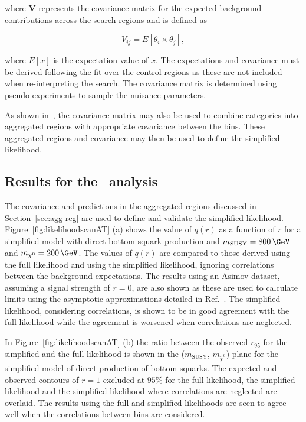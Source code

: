 \noindent where $\mathrm{\mathbf{V}}$ represents the covariance matrix for the expected background 
contributions across the search regions and is defined as

\begin{equation}
V_{ij}=E[\theta_i\times\theta_j],
\label{eq-cov}
\end{equation}

\noindent where $E[x]$ is the expectation value of $x$. The expectations and covariance
must be derived following the fit over the control regions as these are not
included when re-interpreting the search. The covariance matrix is determined
using pseudo-experiments to sample the nuisance parameters. 

As shown in~\cite{simp-lik}, the covariance matrix may also be used to
combine categories into aggregated regions with appropriate covariance between
the bins. These aggregated regions and covariance may then be used to define 
the simplified likelihood.

\subsection{Results for the \alphat~analysis}

The covariance and predictions in the aggregated regions discussed
in Section~\ref{sec:agg-reg} are used to define and validate the simplified likelihood. 
Figure~\ref{fig:likelihoodscanAT} (a) shows the value of $q(r)$ as a function of $r$ for 
a simplified model with direct bottom squark production and $m_\text{SUSY} = 800\, \GeV$ 
and $m_{\chiz} = 200\, \GeV$. The values of $q(r)$ are compared to those derived using the full likelihood and 
using the simplified likelihood, ignoring correlations between the background expectations. 
The results using an Asimov dataset, assuming a signal strength of $r=0$, are also 
shown as these are used to calculate limits using the asymptotic approximations 
detailed in Ref.~\cite{asymp}. The simplified likelihood,
considering correlations, is shown to be in good agreement with the full likelihood while
the agreement is worsened when correlations are neglected.

In Figure~\ref{fig:likelihoodscanAT} (b) the ratio between the observed $r_{95}$ for the simplified 
and the full likelihood is shown in the ($m_{\text{SUSY}}$, $m_{\tilde{\chi}^{0}}$) plane for 
the simplified model of direct production of bottom squarks. The expected and observed contours of $r=1$ 
excluded at $95\%$ for the full likelihood, the simplified likelihood and the 
simplified likelihood where correlations are neglected are overlaid. The results using the 
full and simplified likelihoods are seen to agree well when the correlations between bins are considered.

